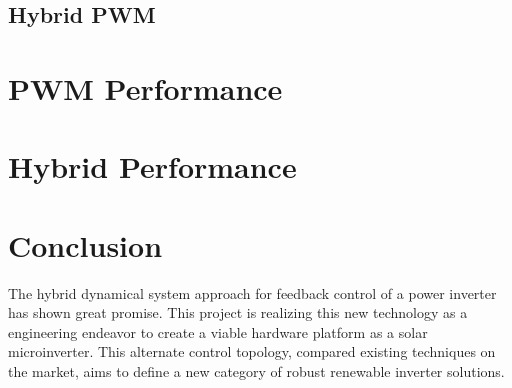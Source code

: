 \subsection{Hybrid PWM}

\section{PWM Performance}

\section{Hybrid Performance}

\section{Conclusion}
The hybrid dynamical system approach for feedback control of a power inverter has shown great promise. This project is realizing this new technology as a engineering endeavor to create a viable hardware platform as a solar microinverter. This alternate control topology, compared existing techniques on the market, aims to define a new category of robust renewable inverter solutions.